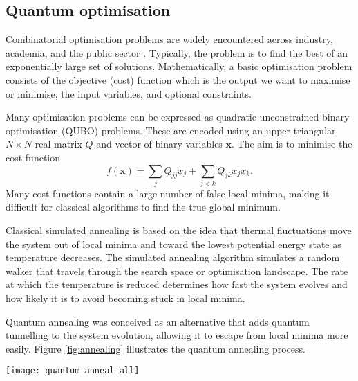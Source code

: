 \documentclass[10pt]{iopart}
\begin{document}

\subsection{Quantum optimisation}\label{ssec:qopt}

Combinatorial optimisation problems are widely encountered across industry, academia, and the public sector \cite{Hauke2020,Yarkoni2022,Emani2021}.  Typically, the problem is to find the best of an exponentially large set of solutions. Mathematically, a basic optimisation problem consists of the objective (cost) function which is the output we want to maximise or minimise, the input variables, and optional constraints.  

Many optimisation problems can be expressed as quadratic unconstrained binary optimisation (QUBO) problems.
These are encoded using an upper-triangular $N \times N$ real matrix $Q$ and vector of binary variables $\mathbf{x}$. The aim is to minimise the cost function
\begin{equation}\label{eq:qubo}
f(\mathbf{x}) = \sum_j Q_{jj} x_j + \sum_{j<k} Q_{jk} x_j x_k.
\end{equation}
Many cost functions contain a large number of false local minima, making it difficult for classical algorithms to find the true global minimum.

Classical simulated annealing \cite{Kirkpatrick1983} is based on the idea that thermal fluctuations move the system out of local minima and toward the lowest potential energy state as temperature decreases. The simulated annealing algorithm simulates a random walker that travels through the search space or optimisation landscape.  The rate at which the temperature is reduced determines how fast the system evolves and how likely it is to avoid becoming stuck in local minima.

Quantum annealing \cite{Finilla1994,Kadowaki1998} was conceived as an alternative that adds quantum tunnelling to the system evolution, allowing it to escape from local minima more easily.  Figure \ref{fig:annealing} illustrates the quantum annealing process. 
%
\begin{figure*}[ht!]
\centering
\texttt{[image: quantum-anneal-all]}
\caption{The full quantum annealing process from problem formulation to solution.  The graphs illustrate how the initially uniform distribution evolves under the driver Hamiltonian to concentrate in the global minimum representing the solution. Adapted from \cite{AuYeung2023}.}
\label{fig:annealing}
\end{figure*}
\end{document}
